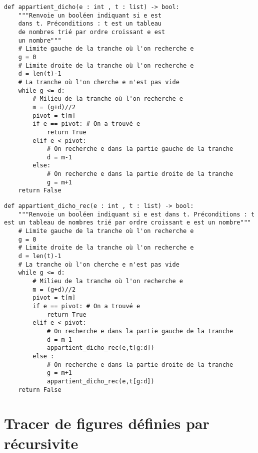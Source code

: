 \noindent\begin{minipage}[c]{.49\linewidth}
\begin{lstlisting}
def appartient_dicho(e : int , t : list) -> bool:
    """Renvoie un booléen indiquant si e est 
    dans t. Préconditions : t est un tableau 
    de nombres trié par ordre croissant e est 
    un nombre"""
    # Limite gauche de la tranche où l'on recherche e
    g = 0 
    # Limite droite de la tranche où l'on recherche e
    d = len(t)-1 
    # La tranche où l'on cherche e n'est pas vide
    while g <= d: 
        # Milieu de la tranche où l'on recherche e
        m = (g+d)//2 
        pivot = t[m]
        if e == pivot: # On a trouvé e
            return True
        elif e < pivot:
            # On recherche e dans la partie gauche de la tranche
            d = m-1 
        else:
            # On recherche e dans la partie droite de la tranche
            g = m+1 
    return False
\end{lstlisting}
\end{minipage} \hfill
\begin{minipage}[c]{.49\linewidth}
\begin{lstlisting}
def appartient_dicho_rec(e : int , t : list) -> bool:
    """Renvoie un booléen indiquant si e est dans t. Préconditions : t est un tableau de nombres trié par ordre croissant e est un nombre"""
    # Limite gauche de la tranche où l'on recherche e
    g = 0 
    # Limite droite de la tranche où l'on recherche e
    d = len(t)-1 
    # La tranche où l'on cherche e n'est pas vide
    while g <= d:
        # Milieu de la tranche où l'on recherche e 
        m = (g+d)//2 
        pivot = t[m]
        if e == pivot: # On a trouvé e
            return True
        elif e < pivot:
            # On recherche e dans la partie gauche de la tranche
            d = m-1 
            appartient_dicho_rec(e,t[g:d])
        else :
            # On recherche e dans la partie droite de la tranche
            g = m+1
            appartient_dicho_rec(e,t[g:d])
    return False
\end{lstlisting}
\end{minipage}

\section{Tracer de figures définies par récursivite}

